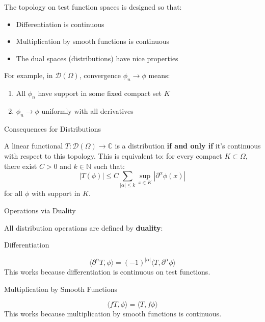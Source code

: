 \documentclass[aps,preprint]{revtex4}
\newenvironment{answer}
  {\begin{tcolorbox}[colback=green!5!white,colframe=green!75!black,title=Answer]}
  {\end{tcolorbox}}
\begin{document}
\begin{answer}
The topology on test function spaces is designed so that:

\begin{itemize}
\item Differentiation is continuous

\item Multiplication by smooth functions is continuous

\item The dual spaces (distributions) have nice properties
\end{itemize}

For example, in $\mathcal{D}(\Omega)$, convergence $\phi_n \to \phi$ means:

\begin{enumerate}
\item All $\phi_n$ have support in some fixed compact set $K$

\item $\phi_n \to \phi$ uniformly with all derivatives
\end{enumerate}

Consequences for Distributions

A linear functional $T: \mathcal{D}(\Omega) \to \mathbb{C}$ is a
distribution \textbf{if and only if} it's continuous with respect to this
topology. This is equivalent to: for every compact $K \subset \Omega$, there
exist $C > 0$ and $k \in \mathbb{N}$ such that: 
\begin{equation*}
|T(\phi)| \leq C \sum_{|\alpha| \leq k} \sup_{x \in K} |\partial^\alpha
\phi(x)|
\end{equation*}
for all $\phi$ with support in $K$.

Operations via Duality

All distribution operations are defined by \textbf{duality}:

Differentiation

\begin{equation*}
\langle \partial^\alpha T, \phi \rangle = (-1)^{|\alpha|} \langle T,
\partial^\alpha \phi \rangle
\end{equation*}
This works because differentiation is continuous on test functions.

Multiplication by Smooth Functions

\begin{equation*}
\langle fT, \phi \rangle = \langle T, f\phi \rangle
\end{equation*}
This works because multiplication by smooth functions is continuous.


\end{answer}
\end{document}
